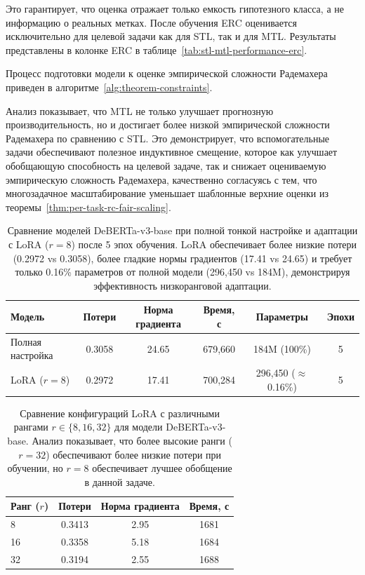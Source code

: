 Это гарантирует, что оценка отражает только емкость гипотезного класса, а не информацию о реальных метках.
После обучения ERC оценивается исключительно для целевой задачи как для STL, так и для MTL.
Результаты представлены в колонке ERC в таблице~\ref{tab:stl-mtl-performance-erc}.

Процесс подготовки модели к оценке эмпирической сложности Радемахера приведен в алгоритме~\ref{alg:theorem-constraints}.

Анализ показывает, что MTL не только улучшает прогнозную производительность, но и достигает более низкой эмпирической сложности Радемахера по сравнению с STL.
Это демонстрирует, что вспомогательные задачи обеспечивают полезное индуктивное смещение, которое как улучшает обобщающую способность на целевой задаче, так и снижает оцениваемую эмпирическую сложность Радемахера, качественно согласуясь с тем, что многозадачное масштабирование уменьшает шаблонные верхние оценки из теоремы~\ref{thm:per-task-rc-fair-scaling}.

\begin{table}[h!t]
  \centering
  \caption{Сравнение моделей DeBERTa-v3-base при полной тонкой настройке и адаптации с LoRA ($r=8$) после 5 эпох обучения. LoRA обеспечивает более низкие потери (0.2972 vs 0.3058), более гладкие нормы градиентов (17.41 vs 24.65) и требует только 0.16\% параметров от полной модели (296{,}450 vs 184M), демонстрируя эффективность низкоранговой адаптации.}
  \label{tab:models_comparison}
  \begin{tabular}{lccccc}
    \toprule
    Модель & Потери & Норма градиента & Время, с & Параметры & Эпохи \\
    \midrule
    Полная настройка & 0.3058 & 24.65 & 679{,}660 & 184M (100\%) & 5 \\
    LoRA ($r=8$) & 0.2972 & 17.41 & 700{,}284 & 296{,}450 ($\approx$0.16\%) & 5 \\
    \bottomrule
  \end{tabular}
\end{table}

\begin{table}[h!t]
  \centering
  \caption{Сравнение конфигураций LoRA с различными рангами $r \in \{8, 16, 32\}$ для модели DeBERTa-v3-base. Анализ показывает, что более высокие ранги ($r=32$) обеспечивают более низкие потери при обучении, но $r=8$ обеспечивает лучшее обобщение в данной задаче.}
  \label{tab:lora_rank}
  \begin{tabular}{lccc}
    \toprule
    \textbf{Ранг ($r$)} & Потери & Норма градиента & Время, с \\
    \midrule
    8  & 0.3413 & 2.95 & 1681 \\
    16 & 0.3358 & 5.18 & 1684 \\
    32 & 0.3194 & 2.55 & 1688 \\
    \bottomrule
  \end{tabular}
\end{table}

